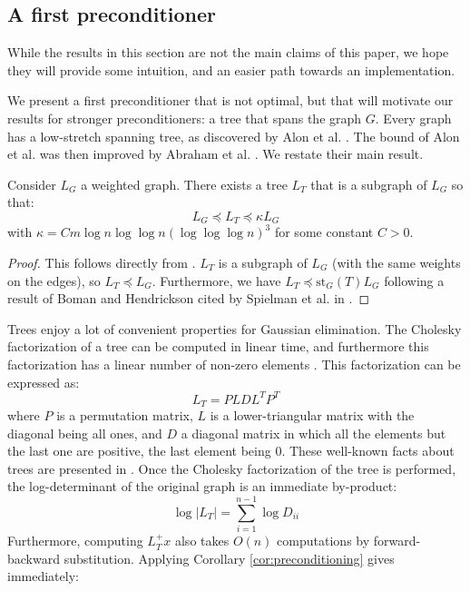 
\subsection{A first preconditioner\label{sec:A-first-preconditioner}}

While the results in this section are not the main claims of this
paper, we hope they will provide some intuition, and an easier path
towards an implementation.

We present a first preconditioner that is not optimal, but that will
motivate our results for stronger preconditioners: a tree that spans
the graph $G$. Every graph has a low-stretch spanning tree, as discovered
by Alon et al. \cite{Alon1995}. The bound of Alon et al. was then
improved by Abraham et al. \cite{Abraham2008}. We restate their main
result. \begin{lemma} Consider $L_{G}$ a weighted graph. There exists
a tree $L_{T}$ that is a subgraph of $L_{G}$ so that: 
\[
L_{G}\preceq L_{T}\preceq\kappa L_{G}
\]
with $\kappa=Cm\log n\log\log n\left(\log\log\log n\right)^{3}$ for
some constant $C>0$.\end{lemma} 

\begin{proof} This follows directly from \cite{Abraham2008}. $L_{T}$
is a subgraph of $L_{G}$ (with the same weights on the edges), so
$L_{T}\preceq L_{G}$. Furthermore, we have $L_{T}\preceq\text{st}_{G}\left(T\right)L_{G}$
following a result of Boman and Hendrickson \cite{Boman2004} cited
by Spielman et al. in \cite{Spielman2010}. \end{proof}

Trees enjoy a lot of convenient properties for Gaussian elimination.
The Cholesky factorization of a tree can be computed in linear time,
and furthermore this factorization has a linear number of non-zero
elements \cite{Spielman2009a}. This factorization can be expressed
as: 
\[
L_{T}=PLDL^{T}P^{T}
\]
where $P$ is a permutation matrix, $L$ is a lower-triangular matrix
with the diagonal being all ones, and $D$ a diagonal matrix in which
all the elements but the last one are positive, the last element being
$0$. These well-known facts about trees are presented in \cite{Spielman2009a}.
Once the Cholesky factorization of the tree is performed, the log-determinant
of the original graph is an immediate by-product: 
\[
\log\left|L_{T}\right|=\sum_{i=1}^{n-1}\log D_{ii}
\]
Furthermore, computing $L_{T}^{+}x$ also takes $O\left(n\right)$
computations by forward-backward substitution. Applying Corollary
\ref{cor:preconditioning} gives immediately: 


